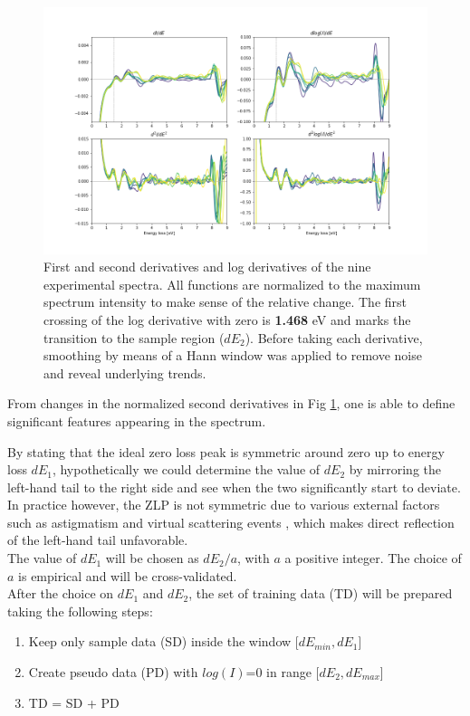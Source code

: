 \begin{figure}[H]
    \centering 
    \includegraphics[width=170mm]{plots/derivatives.png}
    \caption{First and second derivatives and log derivatives of the nine experimental spectra. All functions are normalized to the maximum spectrum intensity to make sense of the relative change. The first crossing of the log derivative with zero is \textbf{1.468} eV and marks the transition to the sample region ($dE_2$). Before taking each derivative, smoothing by means of a Hann window \cite{hann} was applied to remove noise and reveal underlying trends. }
    \label{bound}
\end{figure}

From changes in the normalized second derivatives in Fig \ref{bound}, one is able to define significant features appearing in the spectrum. 

By stating that the ideal zero loss peak is symmetric around zero up to energy loss $dE_1$, hypothetically we could determine the value of $dE_2$ by mirroring the left-hand tail to the right side and see when the two significantly start to deviate. In practice however, the ZLP is not symmetric due to various external factors such as astigmatism \cite{astigma} and virtual scattering events \cite{rafferty}, which makes direct reflection of the left-hand tail unfavorable. \\
The value of $dE_1$ will be chosen as $dE_2 / a$, with $a$ a positive integer. The choice of $a$ is empirical and will be cross-validated. \\ 

After the choice on $dE_1$ and $dE_2$, the set of training data (TD) will be prepared taking the following steps:
\begin{enumerate}
    \item Keep only sample data (SD) inside the window [$dE_{min}, dE_1$]
    \item Create pseudo data (PD) with $log(I)$=0 in range [$dE_2, dE_{max}$]
    \item TD = SD + PD
\end{enumerate}

